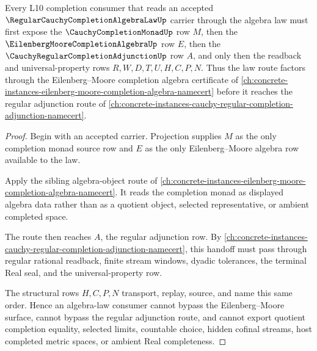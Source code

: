 \begin{theorem}
\label{thm:regular-cauchy-completion-algebra-law-eilenberg-moore-route}
Every L10 completion consumer that reads an accepted $\RegularCauchyCompletionAlgebraLawUp$ carrier through the algebra law must first expose the $\CauchyCompletionMonadUp$ row $M$, then the $\EilenbergMooreCompletionAlgebraUp$ row $E$, then the $\CauchyRegularCompletionAdjunctionUp$ row $A$, and only then the readback and universal-property rows $R,W,D,T,U,H,C,P,N$. Thus the law route factors through the Eilenberg--Moore completion algebra certificate of \autoref{ch:concrete-instances-eilenberg-moore-completion-algebra-namecert} before it reaches the regular adjunction route of \autoref{ch:concrete-instances-cauchy-regular-completion-adjunction-namecert}.
\end{theorem}
\begin{proof}
Begin with an accepted carrier. Projection supplies $M$ as the only completion monad source row and $E$ as the only Eilenberg--Moore algebra row available to the law.

Apply the sibling algebra-object route of \autoref{ch:concrete-instances-eilenberg-moore-completion-algebra-namecert}. It reads the completion monad as displayed algebra data rather than as a quotient object, selected representative, or ambient completed space.

The route then reaches $A$, the regular adjunction row. By \autoref{ch:concrete-instances-cauchy-regular-completion-adjunction-namecert}, this handoff must pass through regular rational readback, finite stream windows, dyadic tolerances, the terminal Real seal, and the universal-property row.

The structural rows $H,C,P,N$ transport, replay, source, and name this same order. Hence an algebra-law consumer cannot bypass the Eilenberg--Moore surface, cannot bypass the regular adjunction route, and cannot export quotient completion equality, selected limits, countable choice, hidden cofinal streams, host completed metric spaces, or ambient Real completeness.
\end{proof}


